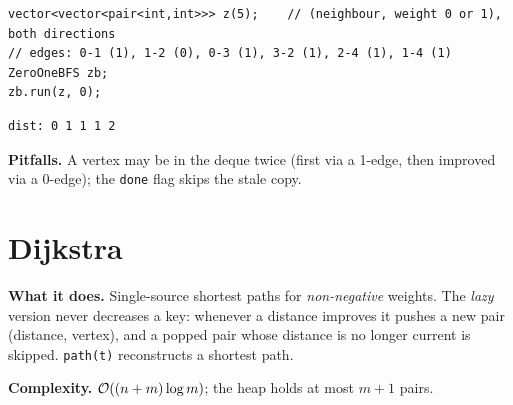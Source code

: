 \begin{lstlisting}[style=snippet]
vector<vector<pair<int,int>>> z(5);    // (neighbour, weight 0 or 1), both directions
// edges: 0-1 (1), 1-2 (0), 0-3 (1), 3-2 (1), 2-4 (1), 1-4 (1)
ZeroOneBFS zb;
zb.run(z, 0);
\end{lstlisting}
\begin{lstlisting}[style=trace]
dist: 0 1 1 1 2
\end{lstlisting}

\textbf{Pitfalls.} A vertex may be in the deque twice (first via a 1-edge, then improved via a 0-edge); the \texttt{done} flag skips the stale copy.



\clneed
\section{Dijkstra}
\label{sec:cl-dijkstra}

\textbf{What it does.} Single-source shortest paths for \emph{non-negative} weights. The \emph{lazy} version never decreases a key: whenever a distance improves it pushes a new pair (distance, vertex), and a popped pair whose distance is no longer current is skipped. \texttt{path(t)} reconstructs a shortest path.

\textbf{Complexity.} $\mathcal{O}((n+m)\log m)$; the heap holds at most $m+1$ pairs.

\begin{diagrambox}
\end{diagrambox}

